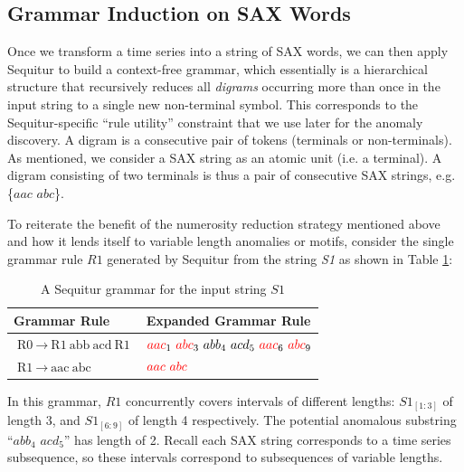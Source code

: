 \documentclass{llncs}
\begin{document}
\subsection{Grammar Induction on SAX Words}\label{rule_utility}
Once we transform a time series into a string of SAX words, we can then apply Sequitur to build a context-free grammar, which essentially is a hierarchical structure that recursively reduces all \textit{digrams} occurring more than once in the input string to a single new non-terminal symbol. This corresponds to the Sequitur-specific ``rule utility'' constraint that we use later for the anomaly discovery. A digram is a consecutive pair of tokens (terminals or non-terminals). As mentioned, we consider a SAX string as an atomic unit (i.e. a terminal). A digram consisting of two terminals is thus a pair of consecutive SAX strings, e.g. \{$aac$ $abc$\}.


To reiterate the benefit of the numerosity reduction strategy mentioned above and how it lends itself to variable length anomalies or motifs, consider the single grammar rule $R1$ generated by Sequitur from the string \textit{S1} as shown in Table \ref{table:rulesS1}:
\begin{table}[h] 
\vspace{-0.8cm}
\caption{A Sequitur grammar for the input string $S1$} 
\vspace{0.2cm}
\centering
\begin{tabularx}{\linewidth}{X X}
\hline
Grammar Rule & Expanded Grammar Rule \\
\hline
$\text{R0}~ \rightarrow~ \text{R1}~ \text{abb}~ \text{acd}~ \text{R1}$ & $ \textcolor{red}{aac}_{1}~ \textcolor{red}{abc}_{3}~ abb_{4}~ acd_{5}~ \textcolor{red}{aac}_{6}~ \textcolor{red}{abc}_{9}$ \\ 
$\text{R1}~ \rightarrow~ \text{aac}~ \text{abc} $ & $\textcolor{red}{aac}~ \textcolor{red}{abc}$ \\


\hline
\end{tabularx}
\label{table:rulesS1} %
\vspace{-0.4cm}
\end{table} 

In this grammar, $R1$ concurrently covers intervals of different lengths: $S1_{[1:3]}$ of length 3, and $S1_{[6:9]}$ of length 4 respectively. The potential anomalous substring ``$abb_{4}$ $acd_{5}$'' has length of 2. Recall each SAX string corresponds to a time series subsequence, so these intervals correspond to subsequences of variable lengths. %
\end{document}
